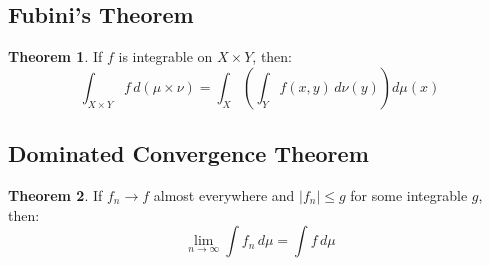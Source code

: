 \documentclass[11pt]{article}
\theoremstyle{definition}
\newtheorem{theorem}{Theorem}[section]
\begin{document}
\subsection{Fubini's Theorem}
\begin{theorem}
If $f$ is integrable on $X \times Y$, then:
$$\int_{X \times Y} f \, d(\mu \times \nu) = \int_X \left(\int_Y f(x,y) \, d\nu(y)\right) d\mu(x)$$
\end{theorem}

\subsection{Dominated Convergence Theorem}
\begin{theorem}
If $f_n \to f$ almost everywhere and $|f_n| \leq g$ for some integrable $g$, then:
$$\lim_{n \to \infty} \int f_n \, d\mu = \int f \, d\mu$$
\end{theorem}
\end{document}
